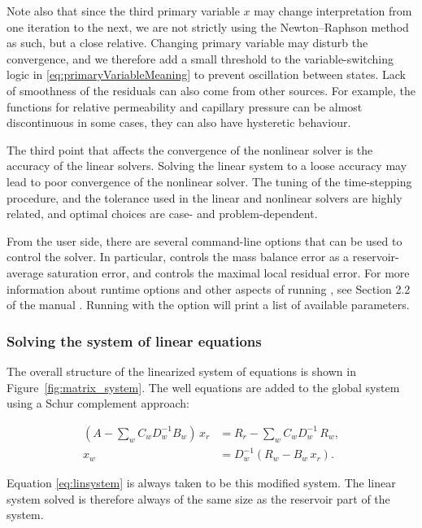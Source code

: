 Note also that since the third primary variable $x$ may change
interpretation from one iteration to the next, we are not strictly
using the Newton--Raphson method as such, but a close
relative. Changing primary variable may disturb the convergence, and we
therefore add a small threshold to the variable-switching logic in
\eqref{eq:primaryVariableMeaning} to prevent oscillation between
states.
Lack of smoothness of the residuals can also come from other sources.
For example, the functions for relative permeability and capillary
pressure can be almost discontinuous in some cases, they can also have
hysteretic behaviour.

The third point that affects the convergence of the nonlinear solver
is the accuracy of the linear solvers. Solving the linear system
to a loose accuracy may lead to poor convergence of the
nonlinear solver. The tuning of the time-stepping procedure, and the
tolerance used in the linear and nonlinear solvers are highly related,
and optimal choices are case- and problem-dependent.

From the user side, there are several command-line
options that can be used to control the solver. In particular,
controls the mass balance error as a reservoir-average saturation
error, and
controls the maximal local residual error.
For more information about runtime options and other aspects of
running \opmflow, see Section 2.2 of the \opmflow manual
\citep{flowmanual}. Running \opmflow with the option  will
print a list of available parameters.

\subsubsection{Solving the system of linear equations}\label{sec:linearsolve}

{\revised
The overall structure of the linearized system of equations is shown
in Figure~\ref{fig:matrix_system}.  The well equations are added to
the global system using a Schur complement approach:

\begin{align}
  \label{eq:wellequation}
(A - \sum_{w}C_wD_w^{-1}B_w)\, x_r &= R_r - \sum_{w}C_wD_w^{-1}\, R_w, \\
x_w &= D_w^{-1}(R_w - B_w \, x_r).
\end{align}

Equation \eqref{eq:linsystem} is always taken to be this modified
system.  The linear system solved is therefore always of the same size
as the reservoir part of the system.
}

